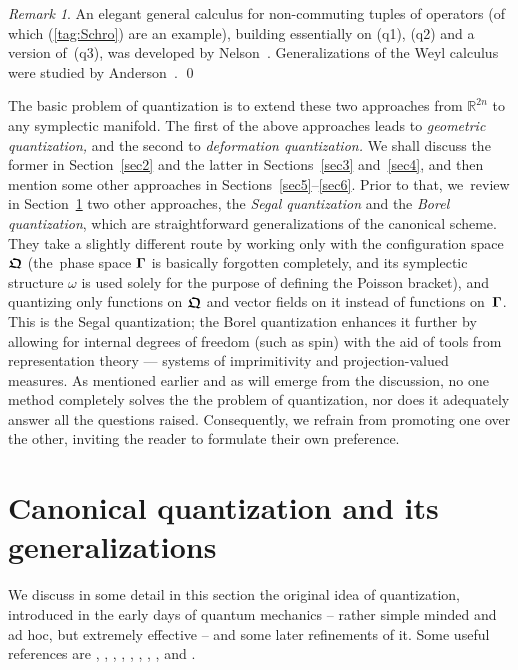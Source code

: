 \documentclass[11pt]{amsart}
\numberwithin{equation}{section}
\theoremstyle{remark}
\newtheorem{remark*}{Remark}
\newcommand\Omg{{\bigam}}   %
\newcommand\RR{\mathbb R}
\newcommand{\bigam}{\mbox{\boldmath $\Gamma$}}
\newcommand{\bfrakQ}{\mbox{\boldmath $\mathfrak Q$}}
\begin{document}
\begin{remark*} An elegant general calculus for non-commuting tuples of
operators (of which (\ref{tag:Schro}) are an example), building essentially on
(q1), (q2) and a version of~(q3), was developed by Nelson~\cite{bib:Nels}.
Generalizations of the Weyl calculus were studied by
Anderson~\cite{bib:Anders}. \qed  \end{remark*}


\medskip

The basic problem of quantization is to extend these two approaches from
$\RR^{2n}$ to any symplectic manifold. The first of the above approaches leads
to {\sl geometric quantization,\/} and the second to {\sl deformation
quantization.\/} We shall discuss the former in Section~\ref{sec2} and  the
latter in Sections~\ref{sec3} and~\ref{sec4}, and then mention some other
approaches in Sections~\ref{sec5}--\ref{sec6}. Prior to that, we~review in
Section~\ref{sec-canquant} two other approaches, the {\sl Segal quantization\/}
and the {\sl Borel quantization\/}, which are straightforward generalizations
of the canonical scheme. They take a slightly different route by working only
with the configuration space~$\bfrakQ$ (the~phase space $\Omg$ is basically
forgotten completely, and its symplectic structure $\omega$ is used solely for
the purpose of defining the Poisson bracket), and quantizing only functions on
$\bfrakQ$ and vector fields on it instead of functions on~$\Omg$. This is the
Segal quantization; the Borel quantization enhances it further by allowing for
internal degrees of freedom (such as spin) with the aid of tools from
representation theory --- systems of imprimitivity and projection-valued
measures. As mentioned earlier and as will emerge from the discussion,
no one method completely solves the
the problem of quantization, nor does it adequately answer all the questions raised.
Consequently, we refrain from promoting one over the other,
inviting the reader to formulate their own preference.




\section{Canonical quantization and its generalizations}\label{sec-canquant}

We discuss in some detail in this section the original idea of quantization,
introduced in the early days of quantum mechanics  -- rather simple minded and
ad hoc, but extremely effective -- and some later refinements of it. Some
useful references are \cite{bib:-doebtol}, \cite{bib:ET},
\cite{bib:-golmensh1}, \cite{bib:-golmensh2}, \cite{bib:Groe}, \cite{bib:-GS},
\cite{bib:vHove}, \cite{bib:-nattermann}, \cite{bib:Segal} and
\cite{bib:-simsudmu1}.
\end{document}
